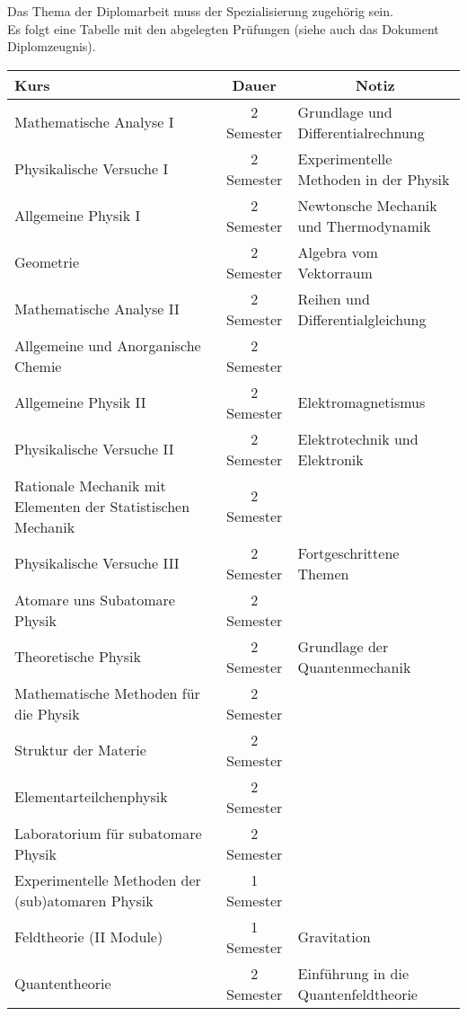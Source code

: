 \documentclass[a4paper,11pt]{article}
\begin{document}
Das Thema der Diplomarbeit muss der Spezialisierung zugeh\"orig sein.\\

Es folgt eine Tabelle mit den abgelegten Pr\"ufungen (siehe auch das Dokument
Diplomzeugnis).

\newpage

\begin{table}[hbt]
\centering
\begin{tabular}{p{5cm}cl}
\toprule
\textbf{Kurs} & \textbf{Dauer}                      &
\multicolumn{1}{c}{\textbf{Notiz}}
\\
\midrule
Mathematische Analyse I  & 2 Semester & Grundlage und
Differentialrechnung \\
Physikalische Versuche I & 2 Semester            & Experimentelle
Methoden in der Physik\\
Allgemeine Physik I     &  2 Semester           &   Newtonsche
Mechanik und Thermodynamik        \\
Geometrie       & 2 Semester           &   Algebra vom
Vektorraum \\
\midrule
Mathematische Analyse II  & 2 Semester & Reihen und Differentialgleichung \\
Allgemeine und Anorganische Chemie & 2 Semester & \\
Allgemeine Physik II & 2 Semester &  Elektromagnetismus\\
Physikalische Versuche II & 2 Semester & Elektrotechnik und Elektronik \\
Rationale Mechanik mit Elementen der Statistischen Mechanik & 2 Semester & \\
\midrule
Physikalische Versuche III & 2 Semester & Fortgeschrittene Themen\\
Atomare uns Subatomare Physik & 2 Semester & \\
Theoretische Physik & 2 Semester & Grundlage der Quantenmechanik\\
Mathematische Methoden f\"ur die Physik & 2 Semester &\\
Struktur der Materie & 2 Semester &\\
\midrule
Elementarteilchenphysik & 2 Semester & \\
Laboratorium f\"ur subatomare Physik & 2 Semester &\\
Experimentelle Methoden der (sub)atomaren Physik & 1 Semester & \\
Feldtheorie (II Module) & 1 Semester & Gravitation\\
Quantentheorie & 2 Semester & Einf\"uhrung in die Quantenfeldtheorie\\
\bottomrule
\end{tabular}
\end{table}
\end{document}
